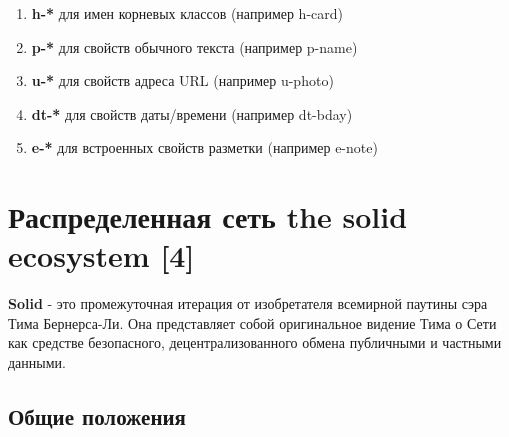 \begin{enumerate}
\def\labelenumi{\arabic{enumi}.}
\tightlist
\item
  \textbf{h-*} для имен корневых классов (например h-card)
\item
  \textbf{p-*} для свойств обычного текста (например p-name)
\item
  \textbf{u-*} для свойств адреса URL (например u-photo)
\item
  \textbf{dt-*} для свойств даты/времени (например dt-bday)
\item
  \textbf{e-*} для встроенных свойств разметки (например e-note)
\end{enumerate}

\hypertarget{ux440ux430ux441ux43fux440ux435ux434ux435ux43bux435ux43dux43dux430ux44f-ux441ux435ux442ux44c-the-solid-ecosystem-4}{%
\section{Распределенная сеть the solid ecosystem
{[}4{]}}\label{ux440ux430ux441ux43fux440ux435ux434ux435ux43bux435ux43dux43dux430ux44f-ux441ux435ux442ux44c-the-solid-ecosystem-4}}

\textbf{Solid} - это промежуточная итерация от изобретателя всемирной
паутины сэра Тима Бернерса-Ли. Она представляет собой оригинальное
видение Тима о Сети как средстве безопасного, децентрализованного обмена
публичными и частными данными.

\hypertarget{ux43eux431ux449ux438ux435-ux43fux43eux43bux43eux436ux435ux43dux438ux44f}{%
\subsection{Общие
положения}\label{ux43eux431ux449ux438ux435-ux43fux43eux43bux43eux436ux435ux43dux438ux44f}}


